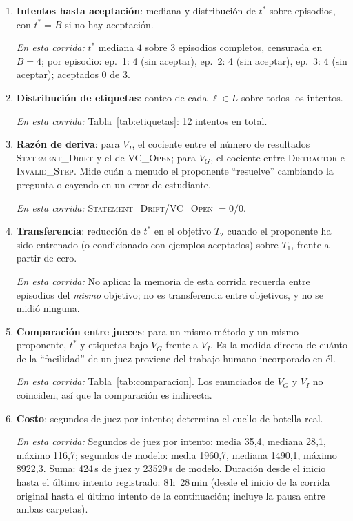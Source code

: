 \documentclass[11pt,a4paper]{article}
\begin{document}
\begin{enumerate}

  \item \textbf{Intentos hasta aceptación}: mediana y distribución de $t^*$ sobre episodios, con $t^* = B$ si no hay aceptación.

  \emph{En esta corrida:} $t^*$ mediana $4$ sobre 3 episodios completos, censurada en $B = 4$; por episodio: ep.~1: 4 (sin aceptar), ep.~2: 4 (sin aceptar), ep.~3: 4 (sin aceptar); aceptados 0 de 3.

  \item \textbf{Distribución de etiquetas}: conteo de cada $\ell \in L$ sobre todos los intentos.

  \emph{En esta corrida:} Tabla~\ref{tab:etiquetas}: 12 intentos en total.

  \item \textbf{Razón de deriva}: para $V_I$, el cociente entre el número de resultados \textsc{Statement\_Drift} y el de \textsc{VC\_Open}; para $V_G$, el cociente entre \textsc{Distractor} e \textsc{Invalid\_Step}. Mide cuán a menudo el proponente ``resuelve'' cambiando la pregunta o cayendo en un error de estudiante.

  \emph{En esta corrida:} \textsc{Statement\_Drift}/\textsc{VC\_Open} $= 0/0$.

  \item \textbf{Transferencia}: reducción de $t^*$ en el objetivo $T_2$ cuando el proponente ha sido entrenado (o condicionado con ejemplos aceptados) sobre $T_1$, frente a partir de cero.

  \emph{En esta corrida:} No aplica: la memoria de esta corrida recuerda entre episodios del \emph{mismo} objetivo; no es transferencia entre objetivos, y no se midió ninguna.

  \item \textbf{Comparación entre jueces}: para un mismo método y un mismo proponente, $t^*$ y etiquetas bajo $V_G$ frente a $V_I$. Es la medida directa de cuánto de la ``facilidad'' de un juez proviene del trabajo humano incorporado en él.

  \emph{En esta corrida:} Tabla~\ref{tab:comparacion}. Los enunciados de $V_G$ y $V_I$ no coinciden, así que la comparación es indirecta.

  \item \textbf{Costo}: segundos de juez por intento; determina el cuello de botella real.

  \emph{En esta corrida:} Segundos de juez por intento: media 35{,}4, mediana 28{,}1, máximo 116{,}7; segundos de modelo: media 1960{,}7, mediana 1490{,}1, máximo 8922{,}3. Suma: 424\,s de juez y 23529\,s de modelo. Duración desde el inicio hasta el último intento registrado: 8\,h~28\,min (desde el inicio de la corrida original hasta el último intento de la continuación; incluye la pausa entre ambas carpetas).

\end{enumerate}
\end{document}
